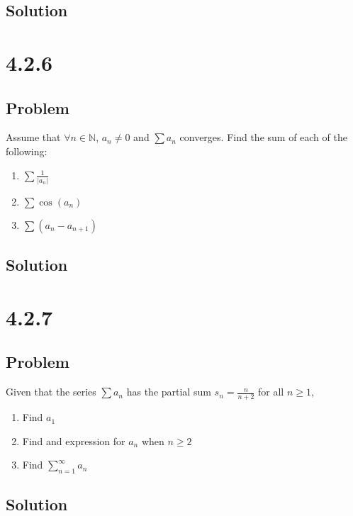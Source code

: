 \documentclass[12pt]{article}
\newcommand{\abs}  [1]{\left|       #1 \right|      }
\newcommand{\N}    [0]{\mathbb{N}                   }
\begin{document}
\subsection*{Solution}



\section*{4.2.6}

\subsection*{Problem}
Assume that $\forall n \in \N$, $a_n \neq 0$ and $\sum a_n$ converges. Find the sum of each of the following:
\begin{enumerate}
    \item $\sum \frac{1}{\abs{a_n}}$
    \item $\sum \cos(a_n)$
    \item $\sum (a_n - a_{n+1})$
\end{enumerate}

\subsection*{Solution}



\section*{4.2.7}

\subsection*{Problem}
Given that the series $\sum a_n$ has the partial sum $s_n = \frac{n}{n+2}$ for all $n \geq 1$,
\begin{enumerate}
    \item Find $a_1$
    \item Find and expression for $a_n$ when $n \geq 2$
    \item Find $\sum_{n=1}^\infty a_n$
\end{enumerate}

\subsection*{Solution}
\end{document}
